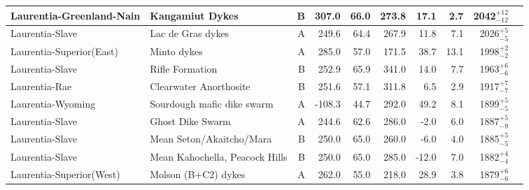 \begin{longtable}{p{1 in}p{1 in}rrrrrrrp{1.5 in}}
      Laurentia-Greenland-Nain &                                  Kangamiut Dykes &      B &     307.0 &      66.0 & 273.8 &  17.1 &       2.7 &   2042$^{+12}_{-12}$ &                                 \cite{Fahrig1976b} \\ \hline
               Laurentia-Slave &                                Lac de Gras dykes &      A &     249.6 &      64.4 & 267.9 &  11.8 &       7.1 &     2026$^{+5}_{-5}$ &                                 \cite{Buchan2009a} \\ \hline
      Laurentia-Superior(East) &                                      Minto dykes &      A &     285.0 &      57.0 & 171.5 &  38.7 &      13.1 &     1998$^{+2}_{-2}$ &                                  \cite{Evans2010a} \\ \hline
               Laurentia-Slave &                                  Rifle Formation &      B &     252.9 &      65.9 & 341.0 &  14.0 &       7.7 &     1963$^{+6}_{-6}$ &                                  \cite{Evans1981a} \\ \hline
                 Laurentia-Rae &                           Clearwater Anorthosite &      B &     251.6 &      57.1 & 311.8 &   6.5 &       2.9 &     1917$^{+7}_{-7}$ &                                  \cite{Halls1999a} \\ \hline
             Laurentia-Wyoming &                       Sourdough mafic dike swarm &      A &    -108.3 &      44.7 & 292.0 &  49.2 &       8.1 &     1899$^{+5}_{-5}$ &                                 \cite{Kilian2016a} \\ \hline
               Laurentia-Slave &                                 Ghost Dike Swarm &      A &     244.6 &      62.6 & 286.0 &  -2.0 &       6.0 &     1887$^{+5}_{-9}$ &                                 \cite{Buchan2016a} \\ \hline
               Laurentia-Slave &                         Mean Seton/Akaitcho/Mara &      B &     250.0 &      65.0 & 260.0 &  -6.0 &       4.0 &     1885$^{+5}_{-5}$ &                               \cite{Mitchell2010c} \\ \hline
               Laurentia-Slave &                   Mean Kahochella, Peacock Hills &      B &     250.0 &      65.0 & 285.0 & -12.0 &       7.0 &     1882$^{+4}_{-4}$ &                               \cite{Mitchell2010c} \\ \hline
      Laurentia-Superior(West) &                              Molson (B+C2) dykes &      A &     262.0 &      55.0 & 218.0 &  28.9 &       3.8 &     1879$^{+6}_{-6}$ &                                  \cite{Evans2010a} \\ \hline

\end{longtable}
